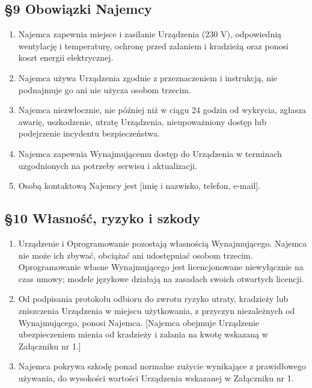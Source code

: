 \documentclass[11pt,a4paper]{article}
\begin{document}
\subsection*{§9 Obowiązki Najemcy}
\begin{enumerate}
\item Najemca zapewnia miejsce i zasilanie Urządzenia (230 V), odpowiednią wentylację i temperaturę, ochronę przed zalaniem i kradzieżą oraz ponosi koszt energii elektrycznej.
\item Najemca używa Urządzenia zgodnie z przeznaczeniem i instrukcją, nie podnajmuje go ani nie użycza osobom trzecim.
\item Najemca niezwłocznie, nie później niż w ciągu 24 godzin od wykrycia, zgłasza awarię, uszkodzenie, utratę Urządzenia, nieupoważniony dostęp lub podejrzenie incydentu bezpieczeństwa.
\item Najemca zapewnia Wynajmującemu dostęp do Urządzenia w terminach uzgodnionych na potrzeby serwisu i aktualizacji.
\item Osobą kontaktową Najemcy jest [imię i nazwisko, telefon, e-mail].
\end{enumerate}

\subsection*{§10 Własność, ryzyko i szkody}
\begin{enumerate}
\item Urządzenie i Oprogramowanie pozostają własnością Wynajmującego. Najemca nie może ich zbywać, obciążać ani udostępniać osobom trzecim. Oprogramowanie własne Wynajmującego jest licencjonowane niewyłącznie na czas umowy; modele językowe działają na zasadach swoich otwartych licencji.
\item Od podpisania protokołu odbioru do zwrotu ryzyko utraty, kradzieży lub zniszczenia Urządzenia w miejscu użytkowania, z przyczyn niezależnych od Wynajmującego, ponosi Najemca. [Najemca obejmuje Urządzenie ubezpieczeniem mienia od kradzieży i zalania na kwotę wskazaną w Załączniku nr 1.]
\item Najemca pokrywa szkodę ponad normalne zużycie wynikające z prawidłowego używania, do wysokości wartości Urządzenia wskazanej w Załączniku nr 1.
\end{enumerate}
\end{document}
